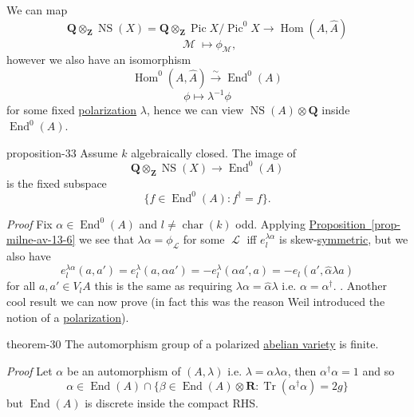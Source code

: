 \documentclass[10pt,]{book}
\makeatletter
\renewcommand*{\proofname}{Proof}
\renewenvironment{proof}[1][\proofname]{\par
  \pushQED{\qed}%
  \normalfont \topsep6\p@\@plus6\p@\relax
  \trivlist
  \item\relax
    {\itshape
    #1\@addpunct{.}}\hspace\labelsep\ignorespaces
}{%
  \popQED\endtrivlist\@endpefalse
}
\numberwithin{equation}{section}
\newcommand{\sheaf}[1]{\operatorname{\mathcal{#1}}}
\newcommand{\inv}{^{-1}}
\newcommand{\ZZ}{\mathbf{Z}}
\newcommand{\QQ}{\mathbf{Q}}
\newcommand{\RR}{\mathbf{R}}
\DeclareMathOperator{\End}{End}
\DeclareMathOperator{\Hom}{Hom}
\DeclareMathOperator{\Pic}{Pic}
\DeclareMathOperator{\characteristic}{char}
\DeclareMathOperator{\trace}{Tr}
\DeclareMathOperator{\NS}{NS}
\makeatother
\begin{document}
We can map%
\begin{equation*}
\QQ \otimes_\ZZ \NS(X) = \QQ \otimes_\ZZ \Pic X/\Pic^0 X \to \Hom(A, \hat A)
\end{equation*}
%
\begin{equation*}
\sheaf M \mapsto \phi_{\sheaf M}\text{,}
\end{equation*}
however we also have an isomorphism%
\begin{equation*}
\Hom^0(A, \hat A) \xrightarrow{\sim} \End^0(A)
\end{equation*}
%
\begin{equation*}
\phi \mapsto \lambda\inv \phi
\end{equation*}
for some fixed \hyperref[def-polarization]{polarization} \(\lambda\), hence we can view \(\NS(A)\otimes \QQ\) inside \(\End^0(A)\).%
\begin{proposition}{}{}{proposition-33}%
\hypertarget{p-351}{}%
Assume \(k\) algebraically closed. The image of%
\begin{equation*}
\QQ \otimes_\ZZ \NS(X) \to \End^0(A)
\end{equation*}
is the fixed subspace%
\begin{equation*}
\{f \in \End^0(A) : f^\dagger = f\}\text{.}
\end{equation*}
%
\end{proposition}
\begin{proof}\hypertarget{proof-59}{}
\hypertarget{p-352}{}%
Fix \(\alpha \in \End^0(A)\) and \(l\ne \characteristic(k)\) odd. Applying \hyperref[prop-milne-av-13-6]{Proposition~\ref{prop-milne-av-13-6}} we see that \(\lambda \alpha = \phi_{\sheaf L}\) for some \(\sheaf L\) iff \(e^{\lambda\alpha}_l\) is skew-\hyperref[def-princ-pol]{symmetric}, but we also have%
\begin{equation*}
e_l^{\lambda\alpha}(a,a')=  e_l^{\lambda}(a,\alpha a') = -e_l^\lambda(\alpha a',a) = -e_l(a', \hat\alpha \lambda a)
\end{equation*}
for all \(a,a' \in V_lA\) this is the same as requiring \(\lambda\alpha = \hat \alpha \lambda\) i.e. \(\alpha = \alpha^\dagger\). .%
\end{proof}
\hypertarget{p-353}{}%
Another cool result we can now prove (in fact this was the reason Weil introduced the notion of a \hyperref[def-polarization]{polarization}).%
\begin{theorem}{}{}{theorem-30}%
\hypertarget{p-354}{}%
The automorphism group of a polarized \hyperref[def-buntes-abvar]{abelian variety} is finite.%
\end{theorem}
\begin{proof}\hypertarget{proof-60}{}
\hypertarget{p-355}{}%
Let \(\alpha\) be an automorphism of \((A, \lambda)\) i.e. \(\lambda =\hat \alpha  \lambda \alpha\), then \(\alpha^\dagger \alpha= 1\) and so%
\begin{equation*}
\alpha \in \End(A)\cap \{\beta \in \End(A) \otimes \RR: \trace(\alpha^\dagger \alpha) = 2g\}
\end{equation*}
but \(\End(A)\) is discrete inside the compact RHS.%
\end{proof}
%
%
\typeout{************************************************}
\typeout{************************************************}
%
\end{document}
